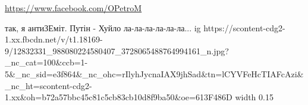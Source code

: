 
 
 
 
 

\url{https://www.facebook.com/OPetroM}\par
так, я антиЗЕміт.
Путін - Хуйло ла-ла-ла-ла-ла-ла...
\ifcmt
  ig https://scontent-cdg2-1.xx.fbcdn.net/v/t1.18169-9/12832331_988080224580407_3728065488764994161_n.jpg?_nc_cat=100&ccb=1-5&_nc_sid=e3f864&_nc_ohc=rIlyhJycnaIAX9jhSad&tn=lCYVFeHcTIAFcAzi&_nc_ht=scontent-cdg2-1.xx&oh=b72a57bbc45c81c5cb83cb10d8f9ba50&oe=613F486D
  width 0.15
\fi

